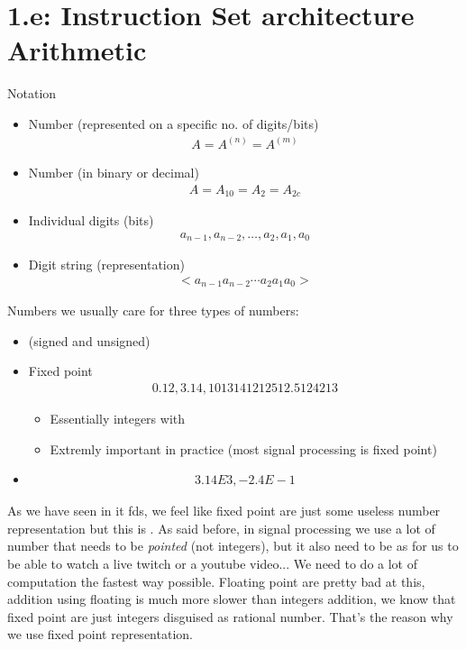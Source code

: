 \section{1.e: Instruction Set architecture Arithmetic}
\begin{parag}{Notation}
    \begin{itemize}
        \item Number (represented on a specific no. of digits/bits)
			\begin{align*} A =  A^{\left(n\right)}  =  A^{\left(m\right)}\end{align*}
		\item  Number (in binary or decimal)
			\begin{align*} A = A_{10} =  A_2 = A_{2c} \end{align*}
			\item Individual digits (bits)
				\begin{align*} a_{n-1}, a_{n-2}, \ldots, a_2, a_1, a_0 \end{align*}
				\item Digit string (representation)
					\begin{align*} <a_{n-1}a_{n-2}\cdots a_2 a_1 a_0> \end{align*}
    \end{itemize}
\end{parag}
\begin{parag}{Numbers}
    we usually care for three types of numbers:
	\begin{itemize}
	    \item {} (signed and unsigned)
		\item Fixed point
			\begin{align*} 0.12, 3.14, 1013141212512.5124213 \end{align*}
			\begin{itemize}
			    \item Essentially integers with 
			    \item Extremly important in practice (most signal processing is fixed point)
			\end{itemize}
		\item {}	
			\begin{align*} 3.14E3, -2.4E-1 \end{align*}
	\end{itemize}
	\begin{framedremark}
	As we have seen in it fds, we feel like fixed point are just some useless number representation but this is . As said before, in signal processing we use a lot of number that needs to be \textit{pointed} (not integers), but it also need to be  as for us to be able to watch a live twitch or a youtube video... We need to do a lot of computation the fastest way possible. Floating point are pretty bad at this, addition using floating is much more slower than integers addition, we know that fixed point are just integers disguised as rational number. That's the reason why we use fixed point representation.
	\end{framedremark}
\end{parag}
